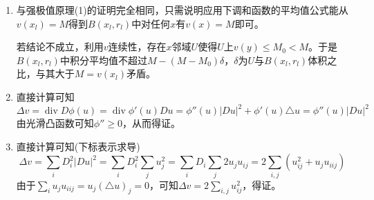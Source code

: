 \documentclass[a4paper,UTF8,fontset=windows,10pt]{ctexart}
\DeclareMathOperator*{\di}{div}
\begin{document}
\begin{enumerate}
\begin{enumerate}[(1)]
        \item 与强极值原理(1)的证明完全相同，只需说明应用下调和函数的平均值公式能从$v(x_l)=M$得到$B(x_l,r_l)$中对任何$x$有$v(x)=M$即可。
        
        若结论不成立，利用$v$连续性，存在$x$邻域$U$使得$U$上$v(y)\le M_0<M$。于是$B(x_l,r_l)$中积分平均值不超过$M-(M-M_0)\delta$，$\delta$为$U$与$B(x_l,r_l)$体积之比，与其大于$M=v(x_l)$矛盾。
    
        \item 直接计算可知
        $$\Delta v=\di D\phi(u)=\di\phi'(u)Du=\phi''(u)|Du|^2+\phi'(u)\triangle u=\phi''(u)|Du|^2$$
        由光滑凸函数可知$\phi''\ge0$，从而得证。
    
        \item 直接计算可知(下标表示求导)
        $$\Delta v=\sum_iD_i^2|Du|^2=\sum_iD_i^2\sum_ju_j^2=\sum_iD_i\sum_j2u_ju_{ij}=2\sum_{i,j}(u_{ij}^2+u_ju_{iij})$$
        由于$\sum_iu_ju_{iij}=u_j(\triangle u)_j=0$，可知$\Delta v=2\sum_{i,j}u_{ij}^2$，得证。
    \end{enumerate}
\end{enumerate}
\end{document}
